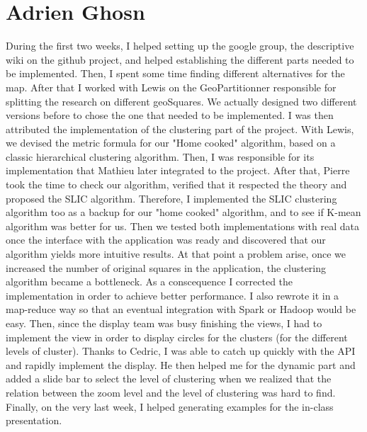 \section{Adrien Ghosn}

During the first two weeks, I helped setting up the google group, the descriptive wiki on the github project, and helped establishing the different parts needed to be implemented. 
Then, I spent some time finding different alternatives for the map. 
After that I worked with Lewis on the GeoPartitionner responsible for splitting the research on different geoSquares. We actually designed two different versions before to chose the one that needed to be implemented.   
I was then attributed the implementation of the clustering part of the project. With Lewis, we devised the metric formula for our "Home cooked" algorithm, based on a classic hierarchical clustering algorithm. Then, I was responsible for its implementation that Mathieu later integrated to the project. After that, Pierre took the time to check our algorithm, verified that it respected the theory and proposed the SLIC algorithm. Therefore, I implemented the SLIC clustering algorithm too as a backup for our "home cooked" algorithm, and to see if K-mean algorithm was better for us. Then we tested both implementations with real data once the interface with the application was ready and discovered that our algorithm yields more intuitive results. At that point a problem arise, once we increased the number of original squares in the application, the clustering algorithm became a bottleneck. As a conscequence I corrected the implementation in order to achieve better performance. I also rewrote it in a map-reduce way so that an eventual integration with Spark or Hadoop would be easy. Then, since the display team was busy finishing the views, I had to implement the view in order to display circles for the clusters (for the different levels of cluster). Thanks to Cedric, I was able to catch up quickly with the API and rapidly implement the display. He then helped me for the dynamic part and added a slide bar to select the level of clustering when we realized that the relation between the zoom level and the level of clustering was hard to find.
Finally, on the very last week, I helped generating examples for the in-class presentation. 



